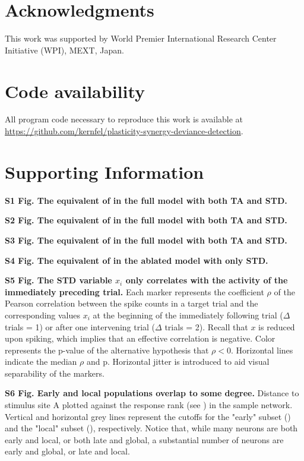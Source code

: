 \documentclass[9pt,lineno,onehalfspacing]{elife}
\begin{document}
\section{Acknowledgments}

This work was supported by World Premier International Research Center Initiative (WPI), MEXT, Japan.

\section{Code availability}

All program code necessary to reproduce this work is available at \\
\url{https://github.com/kernfel/plasticity-synergy-deviance-detection}.



\section{Supporting Information}

\textbf{S1 Fig. The equivalent of  in the full model with both TA and STD.}

\textbf{S2 Fig. The equivalent of  in the full model with both TA and STD.}

\textbf{S3 Fig. The equivalent of  in the full model with both TA and STD.}

\textbf{S4 Fig. The equivalent of  in the ablated model with only STD.}

\textbf{S5 Fig. The STD variable $x_i$ only correlates with the activity of the immediately preceding trial.}
Each marker represents the coefficient $\rho$ of the Pearson correlation between the spike counts in a target trial and the corresponding values $x_i$ at the beginning of the immediately following trial ($\Delta$ trials = 1) or after one intervening trial ($\Delta$ trials = 2). Recall that $x$ is reduced upon spiking, which implies that an effective correlation is negative. Color represents the p-value of the alternative hypothesis that $\rho < 0$. Horizontal lines indicate the median $\rho$ and p. Horizontal jitter is introduced to aid visual separability of the markers.

\textbf{S6 Fig. Early and local populations overlap to some degree.}
Distance to stimulus site A plotted against the response rank (see ) in the sample network. Vertical and horizontal grey lines represent the cutoffs for the "early" subset () and the "local" subset (), respectively. Notice that, while many neurons are both early and local, or both late and global, a substantial number of neurons are early and global, or late and local.
\end{document}
